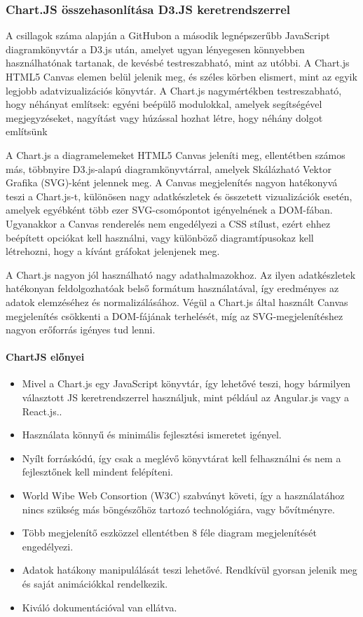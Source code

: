 \subsubsection{Chart.JS összehasonlítása D3.JS keretrendszerrel}
A csillagok száma alapján a GitHubon a második legnépszerűbb JavaScript diagramkönyvtár a D3.js után, amelyet ugyan lényegesen könnyebben használhatónak tartanak, de kevésbé testreszabható, mint az utóbbi. A Chart.js HTML5 Canvas elemen belül jelenik meg, és széles körben elismert, mint az egyik legjobb adatvizualizációs könyvtár.
A Chart.js nagymértékben testreszabható, hogy néhányat említsek: egyéni beépülő modulokkal, amelyek segítségével megjegyzéseket, nagyítást vagy húzással hozhat létre, hogy néhány dolgot említsünk 

	A Chart.js a diagramelemeket HTML5 Canvas jeleníti meg, ellentétben számos más, többnyire D3.js-alapú diagramkönyvtárral, amelyek Skálázható Vektor Grafika (SVG)-ként jelennek meg. A Canvas megjelenítés nagyon hatékonyvá teszi a Chart.js-t, különösen nagy adatkészletek és összetett vizualizációk esetén, amelyek egyébként több ezer SVG-csomópontot igényelnének a DOM-fában. Ugyanakkor a Canvas renderelés nem engedélyezi a CSS stílust, ezért ehhez beépített opciókat kell használni, vagy különböző diagramtípusokaz kell létrehozni, hogy a kívánt gráfokat jelenjenek meg. 

	A Chart.js nagyon jól használható nagy adathalmazokhoz. Az ilyen adatkészletek hatékonyan feldolgozhatóak belső formátum használatával, így eredményes az adatok elemzéséhez és normalizálásához. Végül a Chart.js által használt Canvas megjelenítés csökkenti a DOM-fájának terhelését, míg az SVG-megjelenítéshez nagyon erőforrás igényes tud lenni. 

\paragraph{ChartJS előnyei}

\begin{itemize}
\item Mivel a Chart.js egy JavaScript könyvtár, így lehetővé teszi, hogy bármilyen választott JS keretrendszerrel használjuk, mint például az Angular.js vagy a React.js..
\item Használata könnyű és minimális fejlesztési ismeretet igényel.
\item Nyílt forráskódú, így csak a meglévő könyvtárat kell felhasználni és nem a fejlesztőnek kell mindent felépíteni.
\item World Wibe Web Consortion (W3C) szabványt követi, így a használatához nincs szükség más böngészőhöz tartozó technológiára, vagy bővítményre.
\item Több megjelenítő eszközzel ellentétben 8 féle diagram megjelenítését engedélyezi.
\item Adatok hatákony manipulálását teszi lehetővé. Rendkívül gyorsan jelenik meg és saját animációkkal rendelkezik.
\item Kiváló dokumentációval van ellátva.
\end{itemize}
